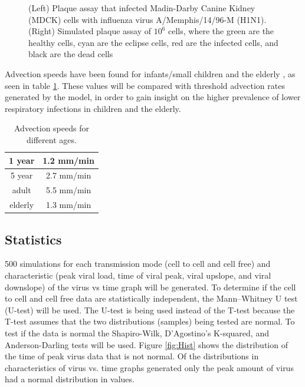 \documentclass[a4paper]{article}
\begin{document}
\begin{figure}[h]
\begin{subfigure}[b]{0.4\linewidth}
        \caption{}
        \label{fig:SimulatedPlaques}
    \end{subfigure}
    \caption{(Left) Plaque assay that infected Madin-Darby Canine Kidney (MDCK) cells with influenza virus A/Memphis/14/96-M (H1N1). (Right) Simulated plaque assay of $10^{6}$ cells, where the green are the healthy cells, cyan are the eclipse cells, red are the infected cells, and black are the dead cells}
    \label{fig:Plaques}
\end{figure}

Advection speeds have been found for infants/small children \cite{Sturm} and the elderly \cite{Puchelle}, as seen in table \ref{tab:AdvectionSpeeds}. These values will be compared with threshold advection rates generated by the model, in order to gain insight on the higher prevalence of lower respiratory infections in children and the elderly.

\begin{table}[h]
    \centering
    \caption{Advection speeds for different ages.}
    \begin{tabular}{|c|c|}
        \hline
        1 year  & 1.2 mm/min\\
        \hline
        5 year  & 2.7 mm/min\\
        \hline
        adult  & 5.5 mm/min\\
        \hline
        elderly  & 1.3 mm/min\\
        \hline
    \end{tabular}
    \label{tab:AdvectionSpeeds}
\end{table}

\subsection{Statistics}
500 simulations for each transmission mode (cell to cell and cell free) and characteristic (peak viral load, time of viral peak, viral upslope, and viral downslope) of the virus vs time graph will be generated. To determine if the cell to cell and cell free data are statistically independent, the Mann–Whitney U test (U-test) will be used. The U-test is being used instead of the T-test because the T-test assumes that the two distributions (samples) being tested are normal. To test if the data is normal the Shapiro-Wilk, D'Agostino's K-squared, and Anderson-Darling tests will be used. Figure \ref{fig:Hist} shows the distribution of the time of peak virus data that is not normal. Of the distributions in characteristics of virus vs. time graphs generated only the peak amount of virus had a normal distribution in values.
\end{document}
